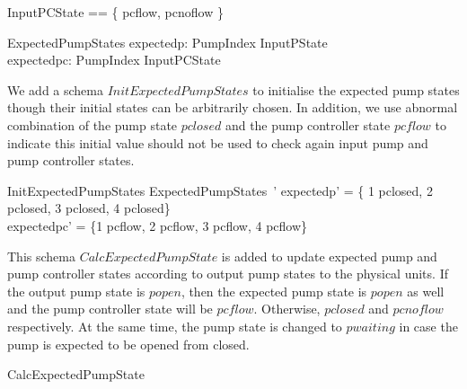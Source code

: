 \documentclass{report} %
\begin{document}
\begin{zed}
  InputPCState == \{ pcflow, pcnoflow \}
\end{zed}

\begin{schema}{ExpectedPumpStates}
  expectedp: PumpIndex \fun InputPState
  \\ %
  expectedpc: PumpIndex \fun InputPCState
\end{schema}

We add a schema $InitExpectedPumpStates$ to initialise the expected pump states though their initial states can be arbitrarily chosen. In addition, we use abnormal combination of the pump state $pclosed$ and the pump controller state $pcflow$ to indicate this initial value should not be used to check again input pump and pump controller states.

\begin{schema}{InitExpectedPumpStates}
    ExpectedPumpStates~'
    \where
    expectedp' = \{ 1 \mapsto pclosed, 2 \mapsto pclosed, 3 \mapsto pclosed, 4 \mapsto pclosed\}\\
    expectedpc' = \{1 \mapsto pcflow, 2 \mapsto pcflow, 3 \mapsto pcflow, 4 \mapsto pcflow\}\\
\end{schema}

This schema $CalcExpectedPumpState$ is added to update expected pump and pump controller states according to output pump states to the physical units. If the output pump state is $popen$, then the expected pump state is $popen$ as well and the pump controller state will be $pcflow$. Otherwise, $pclosed$ and $pcnoflow$ respectively. At the same time, the pump state is changed to $pwaiting$ in case the pump is expected to be opened from closed.
\begin{zed}
CalcExpectedPumpState 
\end{zed}
\end{document}
